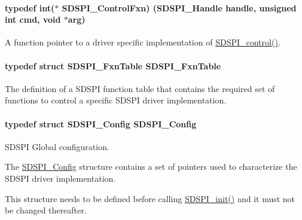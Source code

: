 \paragraph[{S\+D\+S\+P\+I\+\_\+\+Control\+Fxn}]{\setlength{\rightskip}{0pt plus 5cm}typedef int($\ast$ S\+D\+S\+P\+I\+\_\+\+Control\+Fxn) ({\bf S\+D\+S\+P\+I\+\_\+\+Handle} handle, unsigned int cmd, void $\ast$arg)}\label{_s_d_s_p_i_8h_a0fe214b1dedf57fb70d9c83426a4b135}


A function pointer to a driver specific implementation of \hyperlink{_s_d_s_p_i_8h_a541a1db109382fe090ed7a9209a34f61}{S\+D\+S\+P\+I\+\_\+control()}. 

\paragraph[{S\+D\+S\+P\+I\+\_\+\+Fxn\+Table}]{\setlength{\rightskip}{0pt plus 5cm}typedef struct {\bf S\+D\+S\+P\+I\+\_\+\+Fxn\+Table}  {\bf S\+D\+S\+P\+I\+\_\+\+Fxn\+Table}}\label{_s_d_s_p_i_8h_a5d2665a5c69ea532a94acdc45ac1f456}


The definition of a S\+D\+S\+P\+I function table that contains the required set of functions to control a specific S\+D\+S\+P\+I driver implementation. 

\paragraph[{S\+D\+S\+P\+I\+\_\+\+Config}]{\setlength{\rightskip}{0pt plus 5cm}typedef struct {\bf S\+D\+S\+P\+I\+\_\+\+Config}  {\bf S\+D\+S\+P\+I\+\_\+\+Config}}\label{_s_d_s_p_i_8h_acd04506a18457faefc4f3639b6e0a0a1}


S\+D\+S\+P\+I Global configuration. 

The \hyperlink{struct_s_d_s_p_i___config}{S\+D\+S\+P\+I\+\_\+\+Config} structure contains a set of pointers used to characterize the S\+D\+S\+P\+I driver implementation.

This structure needs to be defined before calling \hyperlink{_s_d_s_p_i_8h_a83cfcebe7875d9d8b5e08e57e6785ae6}{S\+D\+S\+P\+I\+\_\+init()} and it must not be changed thereafter.

